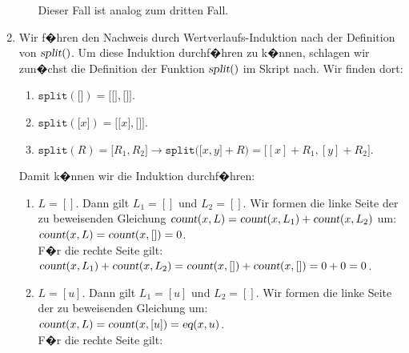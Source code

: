 \documentclass{article}
\renewcommand{\labelenumii}{\arabic{enumii}.}
\begin{document}
\begin{enumerate}
\begin{enumerate}
            Dieser Fall ist analog zum dritten Fall.
      \end{enumerate}
\item Wir f�hren den Nachweis durch Wertverlaufs-Induktion nach der Definition von $\textsl{split}()$.
      Um diese Induktion durchf�hren zu k�nnen, schlagen wir zun�chst die Definition der Funktion 
      $\textsl{split}()$ im Skript nach.  Wir finden dort:
      \begin{enumerate}
        \renewcommand{\labelenumii}{\arabic{enumii}.}
      \item $\mathtt{split}(\texttt{[]}) = \mathtt{[} \texttt{[]}, \texttt{[]} \mathtt{]}$.
      \item $\mathtt{split}(\mathtt{[}x\mathtt{]}) = \mathtt{[} \texttt{[}x\texttt{]}, \texttt{[]} \mathtt{]}$.
      \item $\mathtt{split}(R) = \mathtt{[}R_1, R_2\mathtt{]} \rightarrow
      \mathtt{split}\bigl(\mathtt{[}x, y\mathtt{]} + R\bigr) = \bigl[ [x] + R_1, [y] + R_2 \bigr]$.
      \end{enumerate}
      Damit k�nnen wir die Induktion durchf�hren:
      \begin{enumerate}
        \renewcommand{\labelenumii}{\arabic{enumii}.}
      \item $L=[]$.  Dann gilt $L_1 = []$ und $L_2 = []$. Wir formen die linke Seite der zu beweisenden
            Gleichung $\textsl{count}(x,L) = \textsl{count}(x,L_1) + \textsl{count}(x,L_2)$ um:
            \\[0.2cm]
            \hspace*{1.3cm}
            $\textsl{count}(x,L) = \textsl{count}(x,[]) = 0$.
            \\[0.2cm]
            F�r die rechte Seite gilt:
            \\[0.2cm]
            \hspace*{1.3cm}
            $\textsl{count}(x,L_1) + \textsl{count}(x,L_2) = 
             \textsl{count}(x,[]) + \textsl{count}(x,[]) = 0 + 0 = 0$.
      \item $L = [u]$.  Dann gilt $L_1 = [u]$ und $L_2 = []$. Wir formen die linke Seite der zu beweisenden
            Gleichung  um:
            \\[0.2cm]
            \hspace*{1.3cm}
            $\textsl{count}(x,L) = \textsl{count}(x,[u]) = \textsl{eq}(x,u)$.
            \\[0.2cm]
            F�r die rechte Seite gilt:
            \begin{eqnarray*}

\end{eqnarray*}
\end{enumerate}
\end{enumerate}
\end{document}
